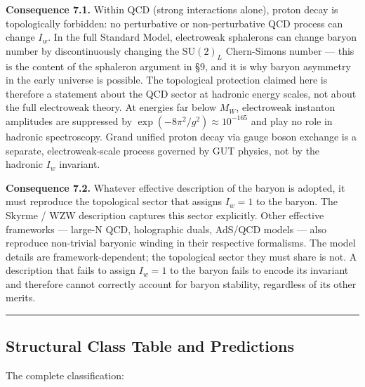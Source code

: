 \textbf{Consequence 7.1.} Within QCD (strong interactions alone), proton
decay is topologically forbidden: no perturbative or non-perturbative
QCD process can change \(I_w\). In the full Standard Model, electroweak
sphalerons can change baryon number by discontinuously changing the
\(\mathrm{SU}(2)_L\) Chern-Simons number --- this is the content of the
sphaleron argument in §9, and it is why baryon asymmetry in the early
universe is possible. The topological protection claimed here is
therefore a statement about the QCD sector at hadronic energy scales,
not about the full electroweak theory. At energies far below \(M_W\),
electroweak instanton amplitudes are suppressed by
\(\exp(-8\pi^2/g^2) \approx 10^{-165}\) and play no role in hadronic
spectroscopy. Grand unified proton decay via gauge boson exchange is a
separate, electroweak-scale process governed by GUT physics, not by the
hadronic \(I_w\) invariant.

\textbf{Consequence 7.2.} Whatever effective description of the baryon
is adopted, it must reproduce the topological sector that assigns
\(I_w = 1\) to the baryon. The Skyrme / WZW description captures this
sector explicitly. Other effective frameworks --- large-N QCD,
holographic duals, AdS/QCD models --- also reproduce non-trivial
baryonic winding in their respective formalisms. The model details are
framework-dependent; the topological sector they must share is not. A
description that fails to assign \(I_w = 1\) to the baryon fails to
encode its invariant and therefore cannot correctly account
for baryon stability, regardless of its other merits.

\begin{center}\rule{0.5\linewidth}{0.5pt}\end{center}

\hypertarget{structural-class-table-and-predictions}{%
\subsection{Structural Class Table and
Predictions}\label{structural-class-table-and-predictions}}

The complete classification:

